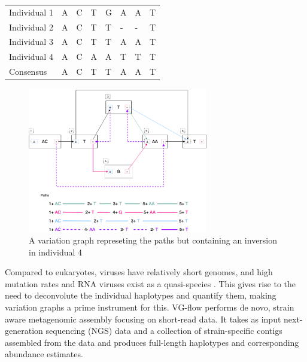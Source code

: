 \documentclass[10pt, a4paper]{article}
\begin{document}
\begin{center}
\begin{tabular}{llllllll}
\color{mypink}Individual 1 & \color{mypink} A & \color{mypink} C & \color{mypink} T & \color{mypink} G & \color{mypink} A & \color{mypink} A & \color{mypink} T\\
\color{myblue}Individual 2 & \color{myblue} A & \color{myblue} C & \color{myblue} T & \color{myblue} T & \color{myblue} - & \color{myblue} - & \color{myblue} T\\
\color{mygreen}Individual 3 & \color{mygreen} A & \color{mygreen} C & \color{mygreen} T & \color{mygreen} T & \color{mygreen} A & \color{mygreen} A & \color{mygreen} T\\
\color{mypurple}Individual 4 & \color{mypurple} A & \color{mypurple} C & \color{mypurple} A & \color{mypurple} A & \color{mypurple} T & \color{mypurple} T & \color{mypurple} T\\
\hline
\color{red}Consensus & \color{red} A & \color{red} C & \color{red} T & \color{red} T & \color{red} A & \color{myred} A & \color{red} T\\
\end{tabular}

\end{center}


\begin{figure}[h!]
\centering
\includegraphics[width=0.7\textwidth]{./figures/Variation-Graph-Page-2.png}
\caption[Variation Graph with Inversion]{\label{fig:org4e60c8a}A variation graph represeting the paths but containing an inversion in individual 4}
\end{figure}


Compared to eukaryotes, viruses have relatively short genomes, and high
mutation rates \cite{duffyWhyAreRNA2018} and RNA viruses exist as a quasi-species
\cite{domingoViralQuasispeciesEvolution2012}.
This gives rise to the need to deconvolute the individual haplotypes and
quantify them, making variation graphs a prime instrument for this.
VG-flow \cite{baaijensStrainawareAssemblyGenomes2019} performs de novo, strain aware metagenomic
assembly focusing on short-read data.  It takes as input next-generation
sequencing (NGS) data and a collection of strain-specific contigs assembled from
the data and produces full-length haplotypes and corresponding abundance
estimates.
\end{document}
